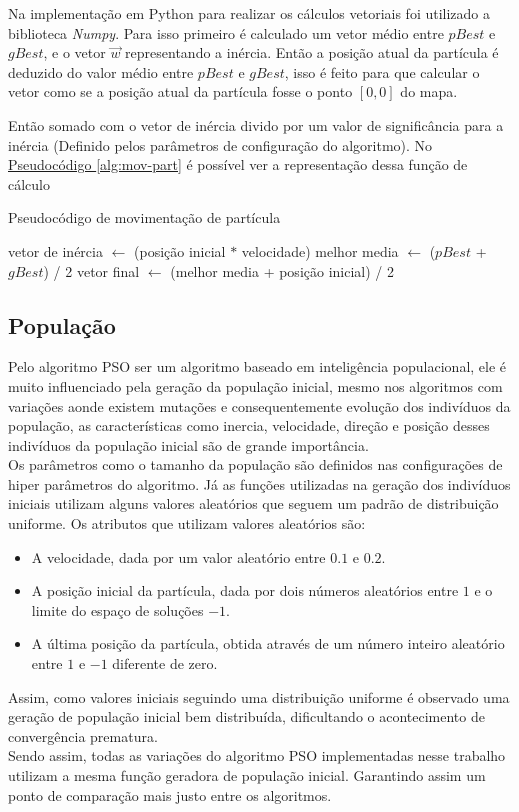 Na implementação em Python para realizar os cálculos vetoriais foi utilizado a biblioteca \textit{Numpy}.
Para isso primeiro é calculado um vetor médio entre $pBest$ e $gBest$, e o vetor $\vec w$ representando a inércia.
Então a posição atual da partícula é deduzido do valor médio entre $pBest$ e $gBest$, isso é feito para que calcular o vetor como se a posição atual da partícula fosse o ponto $[0,0]$ do mapa.


Então somado com o vetor de inércia divido por um valor de significância para a inércia (Definido pelos parâmetros de configuração do algoritmo).
No \hyperref[alg:mov-part]{Pseudocódigo \ref{alg:mov-part}} é possível ver a representação dessa função de cálculo
\begin{algorithm}
    \caption{Pseudocódigo de movimentação de partícula}\label{alg:mov-part}
\begin{algorithmic}
\State vetor de inércia $\gets$ (posição inicial $*$ velocidade)
\State melhor media $\gets$ ($pBest$ + $gBest$) / 2
\State vetor final $\gets$ (melhor media + posição inicial) / 2
\end{algorithmic}
\end{algorithm}
\subsection{População}
Pelo algoritmo PSO ser um algoritmo baseado em inteligência populacional, ele é muito influenciado pela geração da população inicial, mesmo nos algoritmos com variações aonde existem mutações e consequentemente evolução dos indivíduos da população, as características como inercia, velocidade, direção e posição desses indivíduos da população inicial são de grande importância.\\
%
%
\indent Os parâmetros como o tamanho da população são definidos nas configurações de hiper parâmetros do algoritmo.
%
Já as funções utilizadas na geração dos indivíduos iniciais utilizam alguns valores aleatórios que seguem um padrão de distribuição uniforme. Os atributos que utilizam valores aleatórios são:
\begin{itemize}
    \item A velocidade, dada por um valor aleatório entre $0.1$ e $0.2$.
    \item A posição inicial da partícula, dada por dois números aleatórios entre $1$ e o limite do espaço de soluções $- 1$.
    \item A última posição da partícula, obtida através de um número inteiro aleatório entre $1$ e $-1$ diferente de zero.
\end{itemize}
%
%
\indent Assim, como valores iniciais seguindo uma distribuição uniforme é observado uma geração de população inicial bem distribuída, dificultando o acontecimento de convergência prematura.\\
%
%
Sendo assim, todas as variações do algoritmo PSO implementadas nesse trabalho utilizam a mesma função geradora de população inicial.
\noindent Garantindo assim um ponto de comparação mais justo entre os algoritmos.
